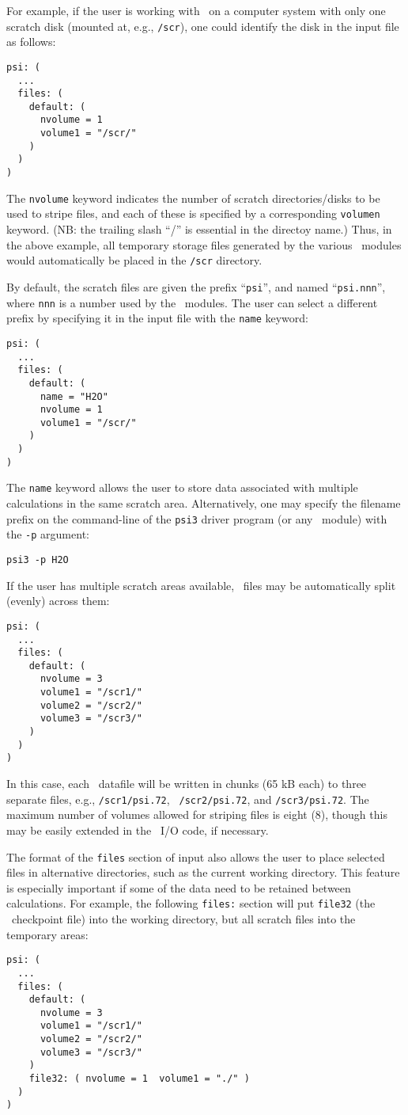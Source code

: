 For example, if the user is working with \PSIthree\ on a computer
system with only one scratch disk (mounted at, e.g., {\tt /scr}), one
could identify the disk in the input file as follows:
\begin{verbatim}
psi: (
  ...
  files: (
    default: (
      nvolume = 1
      volume1 = "/scr/"
    )
  )
)
\end{verbatim}
The {\tt nvolume} keyword indicates the number of scratch
directories/disks to be used to stripe files, and each of these is
specified by a corresponding {\tt volumen} keyword.  (NB: the trailing
slash ``/'' is essential in the directoy name.)  Thus, in the above
example, all temporary storage files generated by the various
\PSIthree\ modules would automatically be placed in the {\tt /scr}
directory.  

By default, the scratch files are given the prefix ``{\tt psi}'', and
named ``{\tt psi.nnn}'', where {\tt nnn} is a number used by the
\PSIthree\ modules.  The user can select a different prefix by
specifying it in the input file with the {\tt name} keyword:
\begin{verbatim}
psi: (
  ...
  files: (
    default: (
      name = "H2O"
      nvolume = 1
      volume1 = "/scr/"
    )
  )
)
\end{verbatim}
The {\tt name} keyword allows the user to store data associated with
multiple calculations in the same scratch area.  Alternatively, one
may specify the filename prefix on the command-line of the {\tt psi3}
driver program (or any \PSIthree\ module) with the {\tt -p} argument:
\begin{verbatim}
psi3 -p H2O
\end{verbatim}

If the user has multiple scratch areas available, \PSIthree\ files may
be automatically split (evenly) across them:
\begin{verbatim}
psi: (
  ...
  files: (
    default: (
      nvolume = 3
      volume1 = "/scr1/"
      volume2 = "/scr2/"
      volume3 = "/scr3/"
    )
  )
)
\end{verbatim}
In this case, each \PSIthree\ datafile will be written in chunks (65
kB each) to three separate files, e.g., {\tt /scr1/psi.72}, {\tt
/scr2/psi.72}, and {\tt /scr3/psi.72}.  The maximum number of volumes
allowed for striping files is eight (8), though this may be easily
extended in the \PSIthree\ I/O code, if necessary.

The format of the {\tt files} section of input also allows the user to
place selected files in alternative directories, such as the current
working directory.  This feature is especially important if some of
the data need to be retained between calculations.  For example, the
following {\tt files:} section will put {\tt file32} (the \PSIthree\
checkpoint file) into the working directory, but all scratch files
into the temporary areas:
\begin{verbatim}
psi: (
  ...
  files: (
    default: (
      nvolume = 3
      volume1 = "/scr1/"
      volume2 = "/scr2/"
      volume3 = "/scr3/"
    )
    file32: ( nvolume = 1  volume1 = "./" )
  )
)
\end{verbatim}

